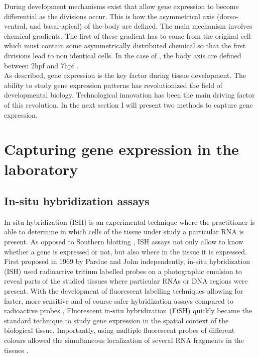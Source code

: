 	During development mechanisms exist that allow gene expression to become differential as the divisions occur. This is how the asymmetrical axis (dorso-ventral, and basal-apical) of the body are defined. The main mechanism involves chemical gradients. The first of these gradient has to come from the original cell which must contain some asymmetrically distributed chemical so that the first divisions lead to non identical cells. In the case of \platyfull{}, the body axis are defined  between 2hpf and 7hpf \cite{Fischer10}.\\
	
	As described, gene expression is the key factor during tissue development. The ability to study gene expression patterns has revolutionized the field of developmental biology. Technological innovation has been the main driving factor of this revolution. In the next section I will present two methods to capture gene expression.


\section{Capturing gene expression in the laboratory}\label{sec:gene_expression_lab}
     \subsection{In-situ hybridization assays}
     In-situ hybridization (ISH) is an experimental technique where the practitioner is able to determine in which cells of the tissue under study a particular RNA is present. As opposed to Southern blotting \cite{southern75}, ISH assays not only allow to know whether a gene is expressed or not, but also where in the tissue it is expressed. First proposed in 1969 by Pardue \cite{pardue69} and John \cite{john69} independently, in-situ hybridization (ISH) used radioactive tritium labelled probes on a photographic emulsion to reveal parts of the studied tissues where particular RNAs or DNA regions were present. With the development of fluorescent labelling techniques \cite{landegent84,pinkel88} allowing for faster, more sensitive and of course safer hybridization assays compared to radioactive probes \cite{swiger96}, Fluorescent in-situ hybridization (FiSH) quickly became the standard technique to study gene expression in the spatial context of the biological tissue. Importantly, using multiple fluorescent probes of different colours allowed the simultaneous localization of several RNA fragments in the tissues \cite{nederlof89}.
     

